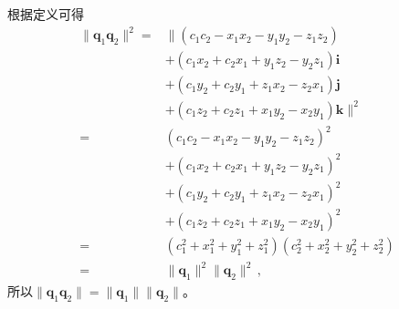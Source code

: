 \begin{prove}
    根据定义可得
    \begin{align}
        \|{\bm q}_1{\bm q}_2\|^2 = & \|(c_1c_2-x_1x_2-y_1y_2-z_1z_2)\nonumber                    \\
                                   & +(c_1x_2+c_2x_1+y_1z_2-y_2z_1)\mathbf{i}\nonumber           \\
                                   & +(c_1y_2+c_2y_1+z_1x_2-z_2x_1)\mathbf{j}\nonumber           \\
                                   & +(c_1z_2+c_2z_1+x_1y_2-x_2y_1)\mathbf{k}\|^2\nonumber       \\
        =                          & (c_1c_2-x_1x_2-y_1y_2-z_1z_2)^2\nonumber                    \\
                                   & +(c_1x_2+c_2x_1+y_1z_2-y_2z_1)^2\nonumber                   \\
                                   & +(c_1y_2+c_2y_1+z_1x_2-z_2x_1)^2\nonumber                   \\
                                   & +(c_1z_2+c_2z_1+x_1y_2-x_2y_1)^2\nonumber                   \\
        =                          & (c_1^2+x_1^2+y_1^2+z_1^2)(c_2^2+x_2^2+y_2^2+z_2^2)\nonumber \\
        =                          & \|{\bm q}_1\|^2\|{\bm q}_2\|^2\, ,
    \end{align}
    所以$\|{\bm q}_1{\bm q}_2\|=\|{\bm q}_1\|\|{\bm q}_2\|$。
\end{prove}

